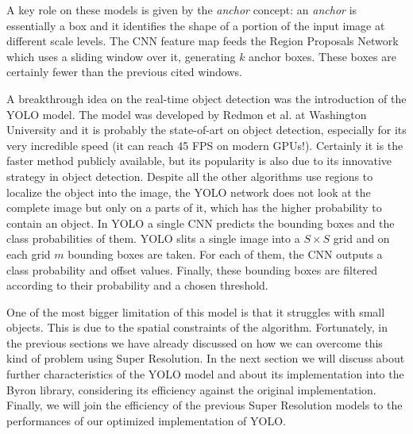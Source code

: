 \documentclass{standalone}
\begin{document}
A key role on these models is given by the \emph{anchor} concept: an \emph{anchor} is essentially a box and it identifies the shape of a portion of the input image at different scale levels.
The CNN feature map feeds the Region Proposals Network which uses a sliding window over it, generating $k$ anchor boxes.
These boxes are certainly fewer than the previous cited  windows.

A breakthrough idea on the real-time object detection was the introduction of the YOLO model.
The model was developed by Redmon et al. at Washington University and it is probably the state-of-art on object detection, especially for its very incredible speed (it can reach 45 FPS on modern GPUs!).
Certainly it is the faster method publicly available, but its popularity is also due to its innovative strategy in object detection.
Despite all the other algorithms use regions to localize the object into the image, the YOLO network does not look at the complete image but only on a parts of it, which has the higher probability to contain an object.
In YOLO a single CNN predicts the bounding boxes and the class probabilities of them.
YOLO slits a single image into a $S\times S$ grid and on each grid $m$ bounding boxes are taken.
For each of them, the CNN outputs a class probability and offset values.
Finally, these bounding boxes are filtered according to their probability and a chosen threshold.

One of the most bigger limitation of this model is that it struggles with small objects.
This is due to the spatial constraints of the algorithm.
Fortunately, in the previous sections we have already discussed on how we can overcome this kind of problem using Super Resolution.
In the next section we will discuss about further characteristics of the YOLO model and about its implementation into the \textsf{Byron} library, considering its efficiency against the original implementation.
Finally, we will join the efficiency of the previous Super Resolution models to the performances of our optimized implementation of YOLO.


\end{document}
